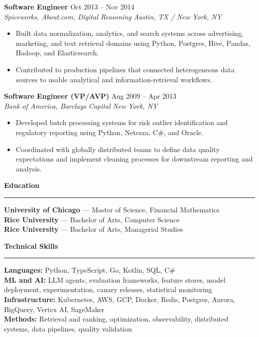 \documentclass[10pt,letterpaper]{article}
\newcommand{\sectiontitle}[1]{%
  \vspace{0.6em}
  {\large \textbf{#1}}\par
  \vspace{0.15em}
  \hrule
  \vspace{0.35em}
}
\newcommand{\roleheading}[4]{%
  \textbf{#1} \hfill #2\\
  \textit{#3} \hfill \textit{#4}\par
  \vspace{0.15em}
}
\begin{document}
\roleheading{Software Engineer}{Oct 2013 -- Nov 2014}{Spiceworks, About.com, Digital Reasoning}{Austin, TX / New York, NY}
\begin{itemize}
  \item Built data normalization, analytics, and search systems across advertising, marketing, and text retrieval domains using Python, Postgres, Hive, Pandas, Hadoop, and Elasticsearch.
  \item Contributed to production pipelines that connected heterogeneous data sources to usable analytical and information-retrieval workflows.
\end{itemize}

\roleheading{Software Engineer (VP/AVP)}{Aug 2009 -- Apr 2013}{Bank of America, Barclays Capital}{New York, NY}
\begin{itemize}
  \item Developed batch processing systems for risk outlier identification and regulatory reporting using Python, Netezza, C\#, and Oracle.
  \item Coordinated with globally distributed teams to define data quality expectations and implement cleaning processes for downstream reporting and analysis.
\end{itemize}

\sectiontitle{Education}
\textbf{University of Chicago} --- Master of Science, Financial Mathematics\\
\textbf{Rice University} --- Bachelor of Arts, Computer Science\\
\textbf{Rice University} --- Bachelor of Arts, Managerial Studies

\sectiontitle{Technical Skills}
\textbf{Languages:} Python, TypeScript, Go, Kotlin, SQL, C\#\\
\textbf{ML and AI:} LLM agents, evaluation frameworks, feature stores, model deployment, experimentation, canary releases, statistical monitoring\\
\textbf{Infrastructure:} Kubernetes, AWS, GCP, Docker, Redis, Postgres, Aurora, BigQuery, Vertex AI, SageMaker\\
\textbf{Methods:} Retrieval and ranking, optimization, observability, distributed systems, data pipelines, quality validation
\end{document}
